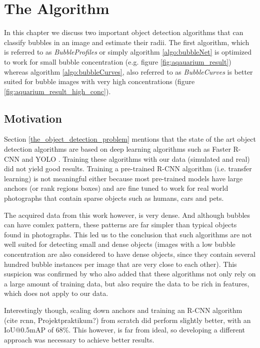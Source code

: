\chapter{The Algorithm} \label{the_algorithm}
	In this chapter we discuss two important object detection algorithms that can classify bubbles in an image and estimate their radii. The first algorithm, which is referred to as \textit{BubbleProfiles} or simply algorithm \ref{algo:bubbleNet} is optimized to work for small bubble concentration (e.g. figure \ref{fig:aqauarium_result}) whereas algorithm \ref{algo:bubbleCurves}, also referred to as \textit{BubbleCurves} is better suited for bubble images with very high concentrations (figure \ref{fig:aquarium_result_high_conc}).
		
	\section{Motivation}
		Section \ref{the_object_detection_problem} mentions that the state of the art object detection algorithms are based on deep learning algorithms such as Faster R-CNN \citep{FasterRCNN} and YOLO \citep{YOLO}. Training these algorithms with our data (simulated and real) did not yield good results. Training a pre-trained R-CNN algorithm (i.e. transfer learning) is not meaningful either because most pre-trained models have large anchors (or rank regions boxes) and are fine tuned to work for real world photographs that contain sparse objects such as humans, cars and pets. 
		
		The acquired data from this work however, is very dense. And although bubbles can have comlex pattern, these patterns are far simpler than typical objects found in photographs. 
		This led us to the conclusion that such algorithms are not well suited for detecting small and dense objects (images with a low bubble concentration are also considered to have dense objects, since they contain several hundred bubble instances per image that are very close to each other). This suspicion was confirmed by \cite{Zhenhua2018} who also added that these algorithms not only rely on a large amount of training data, but also require the data to be rich in features, which does not apply to our data. 
		
	Interestingly though, scaling down anchors and training an R-CNN algorithm (cite rcnn, Projektpraktikum?) from scratch did perform slightly better, with an IoU@0.5mAP of 68\%. This however, is far from ideal, so developing a different approach was necessary to achieve better results. 
		
